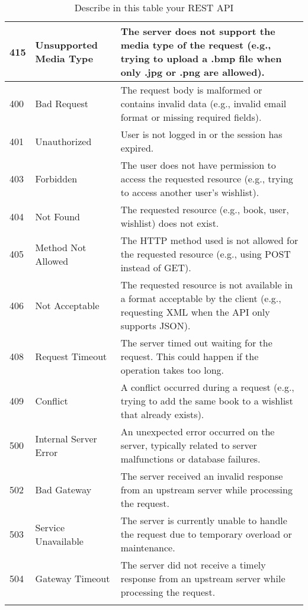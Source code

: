 \begin{longtable}{|p{}|p{} |p{}|}
\hline
415 & Unsupported Media Type & The server does not support the media type of the request (e.g., trying to upload a .bmp file when only .jpg or .png are allowed). \\
\hline
400 & Bad Request & The request body is malformed or contains invalid data (e.g., invalid email format or missing required fields). \\
\hline
401 & Unauthorized & User is not logged in or the session has expired. \\
\hline
403 & Forbidden & The user does not have permission to access the requested resource (e.g., trying to access another user's wishlist). \\
\hline
404 & Not Found & The requested resource (e.g., book, user, wishlist) does not exist. \\
\hline
405 & Method Not Allowed & The HTTP method used is not allowed for the requested resource (e.g., using POST instead of GET). \\
\hline
406 & Not Acceptable & The requested resource is not available in a format acceptable by the client (e.g., requesting XML when the API only supports JSON). \\
\hline
408 & Request Timeout & The server timed out waiting for the request. This could happen if the operation takes too long. \\
\hline
409 & Conflict & A conflict occurred during a request (e.g., trying to add the same book to a wishlist that already exists). \\
\hline
\hline
\hline
500 & Internal Server Error & An unexpected error occurred on the server, typically related to server malfunctions or database failures. \\
\hline
502 & Bad Gateway & The server received an invalid response from an upstream server while processing the request. \\
\hline
503 & Service Unavailable & The server is currently unable to handle the request due to temporary overload or maintenance. \\
\hline
504 & Gateway Timeout & The server did not receive a timely response from an upstream server while processing the request.
\\\hline
\caption{Describe in this table your REST API}
\label{tab:termGlossary}
\end{longtable}
